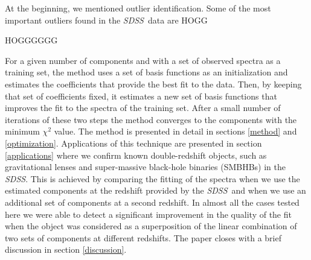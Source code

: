 \documentclass[apj]{emulateapj}
\newcommand{\project}[1]{\textsl{#1}}
\newcommand{\sdss}{\project{SDSS}}
\begin{document}
At the beginning, we mentioned outlier identification.  Some of the
most important outliers found in the \sdss\ data are HOGG

HOGGGGGG

For a given number of components and with a
set of observed spectra as a training set, the method uses a set of
basis functions as an initialization and estimates the coefficients
that provide the best fit to the data. Then, by keeping that set of
coefficients fixed, it estimates a new set of basis functions that
improves the fit to the spectra of the training set. After a small
number of iterations of these two steps the method converges to the
components with the minimum $\chi^2$ value. The method is presented in
detail in sections \ref{method} and \ref{optimization}. Applications
of this technique are presented in section \ref{applications} where we
confirm known double-redshift objects, such as gravitational lenses
and super-massive black-hole binaries (SMBHBs) in the \sdss. This is
achieved by comparing the fitting of the spectra when we use the
estimated components at the redshift provided by the \sdss\ and when
we use an additional set of components at a second redshift. In almost
all the cases tested here we were able to detect a significant
improvement in the quality of the fit when the object was considered
as a superposition of the linear combination of two sets of components
at different redshifts. The paper closes with a brief discussion in
section \ref{discussion}.
\end{document}
